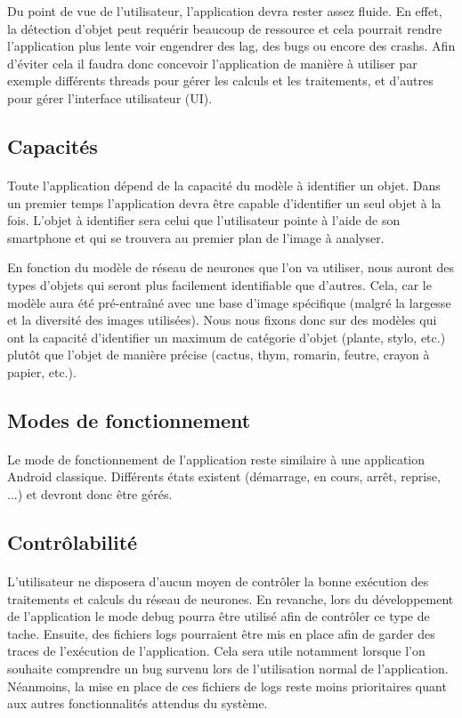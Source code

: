 \documentclass[CDS,UTF8,final]{EPURapport}
\begin{document}
Du point de vue de l'utilisateur, l'application devra rester assez fluide. En effet, la détection d'objet peut requérir beaucoup de ressource et cela pourrait rendre l'application plus lente voir engendrer des lag, des bugs ou encore des crashs. Afin d'éviter cela il faudra donc concevoir l'application de manière à utiliser par exemple différents threads pour gérer les calculs et les traitements, et d'autres pour gérer l'interface utilisateur (UI).

\subsection{Capacités}
\paragraph{}
Toute l'application dépend de la capacité du modèle à identifier un objet. Dans un premier temps l'application devra être capable d'identifier un seul objet à la fois. L'objet à identifier sera celui que l'utilisateur pointe à l'aide de son smartphone et qui se trouvera au premier plan de l'image à analyser.\par 
En fonction du modèle de réseau de neurones que l'on va utiliser, nous auront des types d'objets qui seront plus facilement identifiable que d'autres. Cela, car le modèle aura été pré-entraîné avec une base d'image spécifique (malgré la largesse et la diversité des images utilisées). Nous nous fixons donc sur des modèles qui ont la capacité d'identifier un maximum de catégorie d'objet (plante, stylo, etc.) plutôt que l'objet de manière précise (cactus, thym, romarin, feutre, crayon à papier, etc.).
\subsection{Modes de fonctionnement}
\paragraph{}
Le mode de fonctionnement de l'application reste similaire à une application Android classique. Différents  états existent (démarrage, en cours, arrêt, reprise, ...) et devront donc être gérés.
\subsection{Contrôlabilité}
\paragraph{}
L'utilisateur ne disposera d'aucun moyen de contrôler la bonne exécution des traitements et calculs du réseau de neurones. En revanche, lors du développement de l'application le mode debug pourra être utilisé afin de contrôler ce type de tache. Ensuite, des fichiers logs pourraient être mis en place afin de  garder des traces de l'exécution de l'application. Cela sera utile notamment lorsque l'on souhaite comprendre un bug survenu lors de l'utilisation normal de l'application. Néanmoins, la mise en place de ces fichiers de logs reste moins prioritaires quant aux autres fonctionnalités attendus du système.
\end{document}
